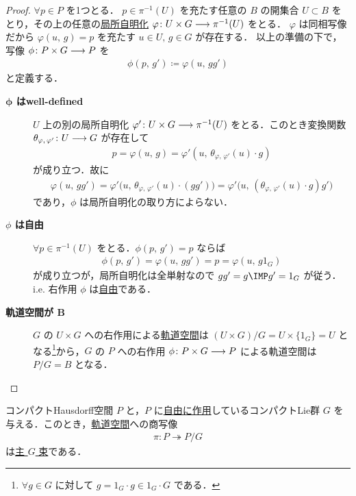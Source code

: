 \documentclass[algtopo_main]{subfiles}
\begin{document}
\begin{proof}
    $\forall p \in P$ を1つとる．
    $p \in \pi^{-1}(U)$ を充たす任意の $B$ の開集合 $U \subset B$ をとり，その上の任意の\hyperref[def:FB]{局所自明化} $\varphi \colon U \times G \longrightarrow \pi^{-1}(U)$ をとる．
    $\varphi$ は同相写像だから $\varphi(u,\, g) = p$ を充たす $u \in U,\, g \in G$ が存在する．
    以上の準備の下で，写像 $\phi \colon P \times G \longrightarrow P$ を
    \begin{align}
        \phi (p,\, g') \coloneqq \varphi(u,\, g g')
    \end{align}
    と定義する．
    \begin{description}
        \item[\textbf{$\bm{\phi}$ はwell-defined}] $U$ 上の別の局所自明化 $\varphi' \colon U \times G \longrightarrow \pi^{-1}(U)$ をとる．このとき変換関数 $\theta_{\varphi,\, \varphi'} \colon U \longrightarrow G$ が存在して
        \begin{align}
            p = \varphi(u,\, g) = \varphi'(u,\, \theta_{\varphi,\, \varphi'}(u) \cdot g)
        \end{align}
        が成り立つ．故に
        \begin{align}
            \varphi(u,\, gg') = \varphi' \bigl( u,\, \theta_{\varphi,\, \varphi'}(u) \cdot (gg') \bigr) = \varphi' \bigl( u,\, (\theta_{\varphi,\, \varphi'} (u) \cdot g)g' \bigr)
        \end{align}
        であり，$\phi$ は局所自明化の取り方によらない．
        \item[\textbf{$\phi$ は自由}] $\forall p \in \pi^{-1}(U)$ をとる．$\phi(p,\, g') = p$ ならば
        \begin{align}
            \phi(p,\, g') = \varphi(u,\, gg') = p = \varphi(u,\, g 1_G)
        \end{align}
        が成り立つが，局所自明化は全単射なので $gg' = g \IMP g' = 1_G$ が従う．i.e. 右作用 $\phi$ は\hyperref[def:TG-action]{自由}である．
        \item[\textbf{軌道空間が $\bm{B}$}] $G$ の $U \times G$ への右作用による\hyperref[def:TG-action]{軌道空間}は $(U \times G) / G = U \times \{1_G\} = U$ となる\footnote{$\forall g \in G$ に対して $g = 1_G \cdot g \in 1_G \cdot G$ である．}から，$G$ の $P$ への右作用 $\phi \colon P \times G \longrightarrow P$ による軌道空間は $P/G = B$ となる．
    \end{description}
    
\end{proof}

\begin{mytheo}[label=thm:GB-orbit]{}
    コンパクトHausdorff空間 $P$ と，$P$ に\hyperref[def:TG-action]{自由に作用}しているコンパクトLie群 $G$ を与える．このとき，\hyperref[def:TG-action]{軌道空間}への商写像
    \begin{align}
        \pi\colon P \twoheadrightarrow P/G
    \end{align}
    は\hyperref[def:GB]{主 $G$ 束}である．
\end{mytheo}
\end{document}
